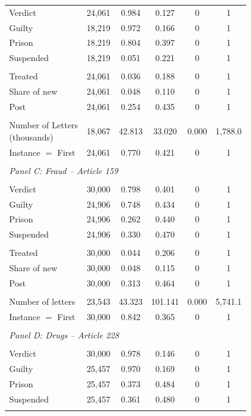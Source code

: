 \documentclass[12pt]{article}
\numberwithin{equation}{section}
\numberwithin{table}{section}
\numberwithin{figure}{section}
\begin{document}
\begin{table}[!htbp]
\begin{threeparttable}
\begin{tabular}{@{\extracolsep{7pt}}lccccc}
  Verdict & 24,061 & 0.984 & 0.127 & 0 & 1 \\ 
Guilty & 18,219 & 0.972 & 0.166 & 0 & 1 \\ 
Prison & 18,219 & 0.804 & 0.397 & 0 & 1 \\ 
Suspended & 18,219 & 0.051 & 0.221 & 0 & 1 \\  \\[-1.8ex] 
Treated & 24,061 & 0.036 & 0.188 & 0 & 1 \\ 
Share of new & 24,061 & 0.048 & 0.110 & 0 & 1 \\ 
Post & 24,061 & 0.254 & 0.435 & 0 & 1 \\  \\[-1.8ex] 
  \makecell[l]{Number of Letters \\ \quad  (thousands)} & 18,067 & 42.813 & 33.020 & 0.000 & 1,788.0 \\ 
  Instance $=$ First & 24,061 & 0.770 & 0.421 & 0 & 1  \\ \\
  \multicolumn{5}{l}{\textit{Panel C: Fraud -- Article 159}} \\ \\[-1.8ex] 
  Verdict & 30,000 & 0.798 & 0.401 & 0 & 1 \\ 
  Guilty & 24,906 & 0.748 & 0.434 & 0 & 1 \\ 
  Prison & 24,906 & 0.262 & 0.440 & 0 & 1 \\ 
  Suspended & 24,906 & 0.330 & 0.470 & 0 & 1 \\ \\[-1.8ex] 
  Treated & 30,000 & 0.044 & 0.206 & 0 & 1 \\ 
 Share of new & 30,000& 0.048 & 0.115 & 0 & 1 \\ 
Post & 30,000 & 0.313 & 0.464 & 0 & 1 \\ \\[-1.8ex] 
  Number of letters &23,543 & 43.323 & 101.141 & 0.000 & 5,741.1 \\ 
  Instance $=$ First & 30,000 & 0.842 & 0.365 & 0 & 1 \\
  \\
  \multicolumn{5}{l}{\textit{Panel D: Drugs -- Article 228}} \\ \\[-1.8ex] 
  Verdict & 30,000 & 0.978 & 0.146 & 0 & 1 \\ 
  Guilty & 25,457 & 0.970 & 0.169 & 0 & 1 \\ 
  Prison & 25,457 & 0.373 & 0.484 & 0 & 1 \\ 
  Suspended & 25,457 & 0.361 & 0.480 & 0 & 1 \\  \\[-1.8ex] 

\end{tabular}
\end{threeparttable}
\end{table}
\end{document}
